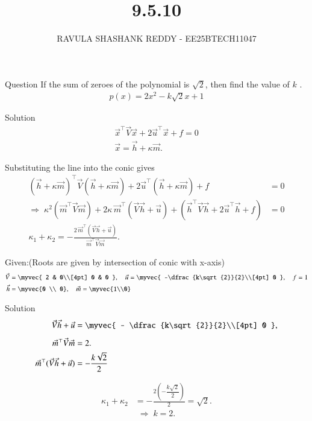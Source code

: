 \documentclass{beamer}
\title %
{9.5.10}
\author %
{RAVULA SHASHANK REDDY - EE25BTECH11047}
\begin{document}
	
	
	\frame{\titlepage}
	\begin{frame}{Question}
    If the sum of zeroes of the polynomial is $\sqrt{2}$, then find the value of $k$ .
\begin{align*}
    p(x)=2x^2-k\sqrt{2}x+1
\end{align*}

\end{frame}
\begin{frame}{Solution}
    \begin{align}
\vec{x}^\top \vec{V} \vec{x} + 2\vec{u}^\top \vec{x} + f = 0\\
\vec{x} = \vec{h} + \kappa \vec{m}.
\end{align}

Substituting the line into the conic gives
\begin{align}
(\vec{h} + \kappa \vec{m})^\top \vec{V} (\vec{h} + \kappa \vec{m}) + 2\vec{u}^\top (\vec{h} + \kappa \vec{m}) + f &= 0 \\
\Rightarrow\;
\kappa^2(\vec{m}^\top \vec{V} \vec{m}) + 2\kappa\, \vec{m}^\top(\vec{V}\vec{h} + \vec{u}) + (\vec{h}^\top \vec{V} \vec{h} + 2\vec{u}^\top \vec{h} + f) &= 0\\
\kappa_1 + \kappa_2 = -\frac{2\,\vec{m}^\top(\vec{V}\vec{h}+\vec{u})}{\vec{m}^\top \vec{V} \vec{m}}.
\end{align}

Given:(Roots are given by intersection of conic with x-axis)
\begin{align}
\vec{V} &=
\myvec{
2 & 0\\[4pt]
0 & 0
}, \quad
\vec{u} =
\myvec{
-\dfrac{k\sqrt{2}}{2}\\[4pt]
0
}, \quad
f = 1\\
\vec{h}&=\myvec{0 \\ 0},\quad \vec{m}=\myvec{1\\0}\\
\end{align}
\end{frame}
\begin{frame}{Solution}
\begin{align}
\vec{V}\vec{h} + \vec{u} &=
\myvec{
- \dfrac{k\sqrt{2}}{2}\\[4pt]
0
},\\[4pt]
\vec{m}^\top \vec{V} \vec{m} &= 2.\\
\vec{m}^\top (\vec{V}\vec{h} + \vec{u})&= - \dfrac{k\sqrt{2}}{2}
\end{align}

\begin{align}
\kappa_1 + \kappa_2 
&= -\frac{2(- \dfrac{k\sqrt{2}}{2})}{2}=\sqrt{2}.
\end{align}
\begin{align}
\Rightarrow\;\boxed{k = 2}.
\end{align}

\end{frame}
\end{document}
